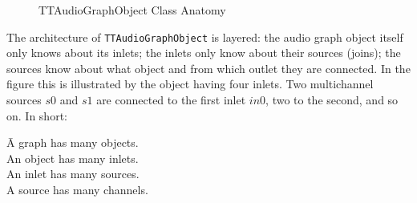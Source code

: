 \documentclass[twoside,a4paper]{article}
\begin{document}
%
\begin{figure}[!htbp]
\centerline{}
\caption{TTAudioGraphObject Class Anatomy}
\label{fig:anatomy}
\end{figure}
%
\noindent The architecture of \texttt{TTAudioGraphObject} is layered: the audio graph object itself only knows about its inlets; the inlets only know about their sources (joins); the sources know about what object and from which outlet they are connected. 
In the figure this is illustrated by the object having four inlets. 
Two multichannel sources $s0$ and $s1$ are connected to the first inlet $in0$, two to the second, and so on. 
In short:
\begin{tabbing}
\hspace{2.6cm}\=A graph has many objects.\\
	\>An object has many inlets.\\
	\>An inlet has many sources.\\
	\>A source has many channels.
\end{tabbing}
\end{document}
